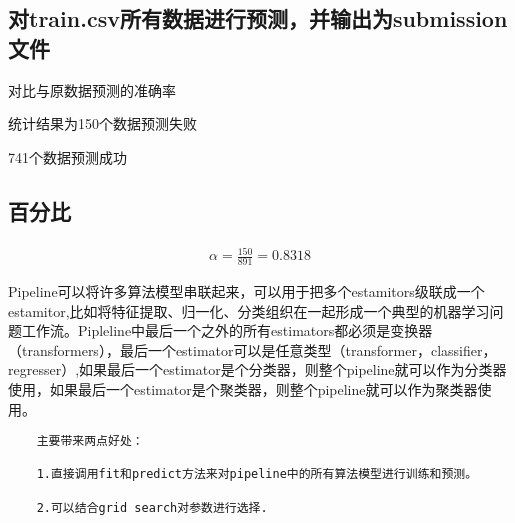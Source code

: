 \documentclass[11pt]{article}
\begin{document}
    \subsection{对train.csv所有数据进行预测，并输出为submission文件}\label{ux5bf9train.csvux6240ux6709ux6570ux636eux8fdbux884cux9884ux6d4bux5e76ux8f93ux51faux4e3asubmissionux6587ux4ef6}

对比与原数据预测的准确率

统计结果为150个数据预测失败

741个数据预测成功

\subsection{百分比}\label{ux767eux5206ux6bd4}

    \[
\begin{align}
\alpha =\frac{150}{891}=0.8318
\end{align}
\]

    Pipeline可以将许多算法模型串联起来，可以用于把多个estamitors级联成一个estamitor,比如将特征提取、归一化、分类组织在一起形成一个典型的机器学习问题工作流。Pipleline中最后一个之外的所有estimators都必须是变换器（transformers），最后一个estimator可以是任意类型（transformer，classifier，regresser）,如果最后一个estimator是个分类器，则整个pipeline就可以作为分类器使用，如果最后一个estimator是个聚类器，则整个pipeline就可以作为聚类器使用。

\begin{verbatim}
    主要带来两点好处：

    1.直接调用fit和predict方法来对pipeline中的所有算法模型进行训练和预测。

    2.可以结合grid search对参数进行选择.
\end{verbatim}


    
    
    
    
\end{document}
